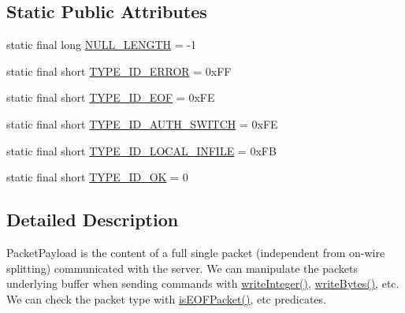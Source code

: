 \subsection*{Static Public Attributes}
\begin{DoxyCompactItemize}
\item 
static final long \mbox{\hyperlink{classcom_1_1mysql_1_1cj_1_1protocol_1_1a_1_1_native_packet_payload_aa433964e3274cf5500def5db6794b18d}{N\+U\+L\+L\+\_\+\+L\+E\+N\+G\+TH}} = -\/1
\item 
static final short \mbox{\hyperlink{classcom_1_1mysql_1_1cj_1_1protocol_1_1a_1_1_native_packet_payload_aaa3e674a10a430e623fe2b836dbd63c3}{T\+Y\+P\+E\+\_\+\+I\+D\+\_\+\+E\+R\+R\+OR}} = 0x\+FF
\item 
static final short \mbox{\hyperlink{classcom_1_1mysql_1_1cj_1_1protocol_1_1a_1_1_native_packet_payload_a5e6f1efc8b1c366b74219d7de151b15e}{T\+Y\+P\+E\+\_\+\+I\+D\+\_\+\+E\+OF}} = 0x\+FE
\item 
static final short \mbox{\hyperlink{classcom_1_1mysql_1_1cj_1_1protocol_1_1a_1_1_native_packet_payload_a7877c9cad9d781274ac6c8efa78cfbce}{T\+Y\+P\+E\+\_\+\+I\+D\+\_\+\+A\+U\+T\+H\+\_\+\+S\+W\+I\+T\+CH}} = 0x\+FE
\item 
static final short \mbox{\hyperlink{classcom_1_1mysql_1_1cj_1_1protocol_1_1a_1_1_native_packet_payload_aeda83ee2cea335a96baa7a12e048c6bc}{T\+Y\+P\+E\+\_\+\+I\+D\+\_\+\+L\+O\+C\+A\+L\+\_\+\+I\+N\+F\+I\+LE}} = 0x\+FB
\item 
static final short \mbox{\hyperlink{classcom_1_1mysql_1_1cj_1_1protocol_1_1a_1_1_native_packet_payload_a6c870c37287d975707cae76682221e08}{T\+Y\+P\+E\+\_\+\+I\+D\+\_\+\+OK}} = 0
\end{DoxyCompactItemize}


\subsection{Detailed Description}
Packet\+Payload is the content of a full single packet (independent from on-\/wire splitting) communicated with the server. We can manipulate the packet\textquotesingle{}s underlying buffer when sending commands with \mbox{\hyperlink{classcom_1_1mysql_1_1cj_1_1protocol_1_1a_1_1_native_packet_payload_ad9d225e02fbb482471592f99b5a16958}{write\+Integer()}}, \mbox{\hyperlink{classcom_1_1mysql_1_1cj_1_1protocol_1_1a_1_1_native_packet_payload_add0512948b6c89c36d0e88b75666e181}{write\+Bytes()}}, etc. We can check the packet type with \mbox{\hyperlink{classcom_1_1mysql_1_1cj_1_1protocol_1_1a_1_1_native_packet_payload_aebc952e2498deecf37b0b02c313b7bb8}{is\+E\+O\+F\+Packet()}}, etc predicates.

